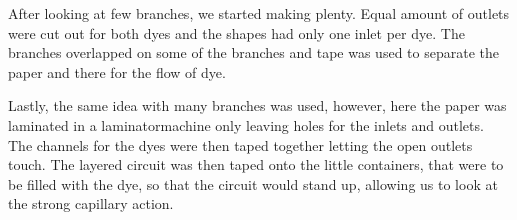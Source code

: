 After looking at few branches, we started making plenty. Equal amount of outlets were cut out for both dyes and the shapes had only one inlet per dye. The branches overlapped on some of the branches and tape was used to separate the paper and there for the flow of dye. 

Lastly, the same idea with many branches was used, however, here the paper was laminated in a laminatormachine only leaving holes for the inlets and outlets. The channels for the dyes were then taped together letting the open outlets touch. The layered circuit was then taped onto the little containers, that were to be filled with the dye, so that the circuit would stand up, allowing us to look at the strong capillary action.


